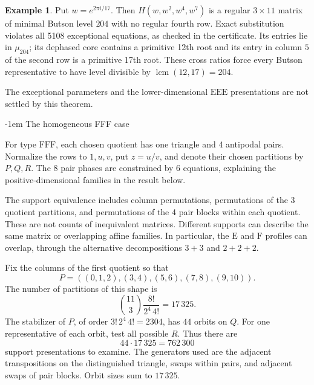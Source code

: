 \documentclass[11pt,a4paper]{article}
\makeatletter
\theoremstyle{plain}
\theoremstyle{definition}
\newtheorem{example}[theorem]{Example}
\theoremstyle{plain}
\renewcommand\subsection{\@startsection{subsection}{2}{\z@}  {\medskipamount}  {-1em}  {\normalfont\normalsize\bfseries}}
\makeatother
\begin{document}
\par\addvspace{\medskipamount}\noindent
\begin{minipage}{\linewidth}
\begin{example}\label{eee_generic:example}
Put $w=e^{2\pi i/17}$. Then $H(w,w^2,w^4,w^7)$ is a regular $3\times11$ matrix of minimal Butson level $204$ with no regular fourth row. Exact substitution violates all 5108 exceptional equations, as checked in the certificate. Its entries lie in $\mu_{204}$; its dephased core contains a primitive 12th root and its entry in column $5$ of the second row is a primitive 17th root. These cross ratios force every Butson representative to have level divisible by $\operatorname{lcm}(12,17)=204$.
\end{example}
\end{minipage}
\par\addvspace{\medskipamount}

The exceptional parameters and the lower-dimensional $\mathrm{EEE}$ presentations are not settled by this theorem.

\subsection{The homogeneous FFF case}\label{sec:FFF}

\medskip
For type $\mathrm{FFF}$, each chosen quotient has one triangle and 4 antipodal pairs. Normalize the rows to $1,u,v$, put $z=u/v$, and denote their chosen partitions by $P,Q,R$. The 8 pair phases are constrained by 6 equations, explaining the positive-dimensional families in the result below.

The support equivalence includes column permutations, permutations of the 3 quotient partitions, and permutations of the 4 pair blocks within each quotient. These are not counts of inequivalent matrices. Different supports can describe the same matrix or overlapping affine families. In particular, the $\mathrm{E}$ and $\mathrm{F}$ profiles can overlap, through the alternative decompositions $3+3$ and $2+2+2$.

\medskip
Fix the columns of the first quotient so that
$$P=((0,1,2),(3,4),(5,6),(7,8),(9,10)).$$
The number of partitions of this shape is
$$\binom{11}{3}\frac{8!}{2^4\,4!}=17\,325.$$
The stabilizer of $P$, of order $3!\,2^4\,4!=2304$, has $44$ orbits on $Q$. For one representative of each orbit, test all possible $R$. Thus there are
$$44\cdot17\,325=762\,300$$
support presentations to examine. The generators used are the adjacent transpositions on the distinguished triangle, swaps within pairs, and adjacent swaps of pair blocks. Orbit sizes sum to $17\,325$.
\end{document}
